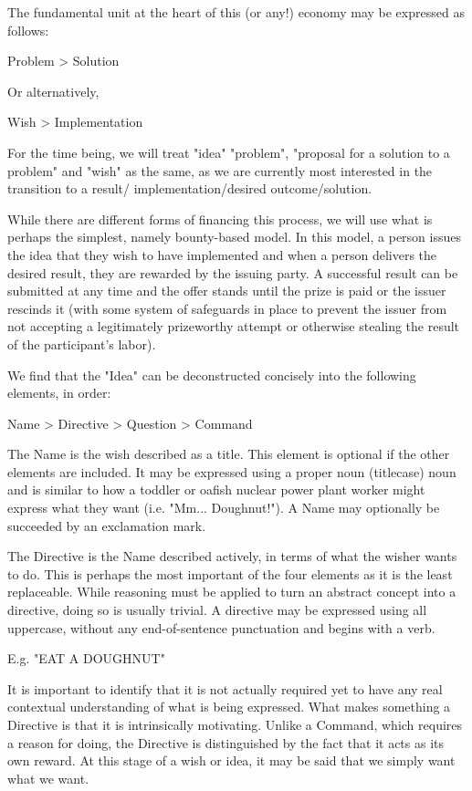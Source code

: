\documentclass{article}
\begin{document}
\begin{multicols}{2}
The fundamental unit at the heart of this (or any!) economy may be expressed as follows:

Problem > Solution

Or alternatively,

Wish > Implementation

For the time being, we will treat "idea" "problem", "proposal for a solution to a problem" and "wish" as the same, as we are currently most interested in the transition to a result/ implementation/desired outcome/solution.

While there are different forms of financing this process, we will use what is perhaps the simplest, namely bounty-based model. In this model, a person issues the idea that they wish to have implemented and when a person delivers the desired result, they are rewarded by the issuing party. A successful result can be submitted at any time and the offer stands until the prize is paid or the issuer rescinds it (with some system of safeguards in place to prevent the issuer from not accepting a legitimately prizeworthy attempt or otherwise stealing the result of the participant's labor).

We find that the "Idea" can be deconstructed concisely into the following elements, in order:

Name > Directive > Question > Command

The Name is the wish described as a title. This element is optional if the other elements are included. It may be expressed using a proper noun (titlecase) noun and is similar to how a toddler or oafish nuclear power plant worker might express what they want (i.e. "Mm... Doughnut!"). A Name may optionally be succeeded by an exclamation mark.

The Directive is the Name described actively, in terms of what the wisher wants to do. This is perhaps the most important of the four elements as it is the least replaceable. While reasoning must be applied to turn an abstract concept into a directive, doing so is usually trivial. A directive may be expressed using all uppercase, without any end-of-sentence punctuation and begins with a verb.

E.g. "EAT A DOUGHNUT"

It is important to identify that it is not actually required yet to have any real contextual understanding of what is being expressed. What makes something a Directive is that it is intrinsically motivating. Unlike a Command, which requires a reason for doing, the Directive is distinguished by the fact that it acts as its own reward. At this stage of a wish or idea, it may be said that we simply want what we want.


\end{multicols}
\end{document}
